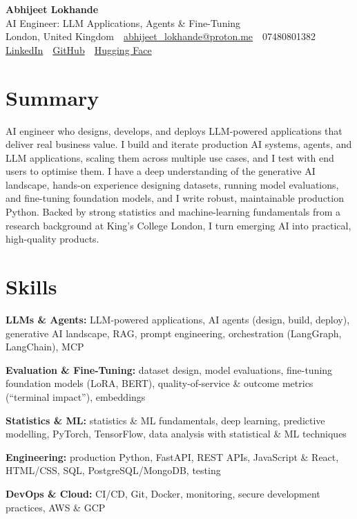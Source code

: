 \documentclass[10pt,a4paper]{article}
\newcommand{\sep}{\,\textcolor{accent!60}{\textbar}\,}
\begin{document}
\begin{center}
  {\fontsize{24}{26}\selectfont\bfseries Abhijeet Lokhande}\\[3pt]
  {\color{accent}\large AI Engineer: LLM Applications, Agents \& Fine-Tuning}\\[5pt]
  {\small
    London, United Kingdom \sep
    \href{mailto:abhijeet_lokhande@proton.me}{abhijeet\_lokhande@proton.me} \sep
    07480801382 \\[2pt]
    \href{https://www.linkedin.com/in/ablds/}{LinkedIn} \sep
    \href{https://github.com/abhijeetscode}{GitHub} \sep
    \href{https://huggingface.co/ab-ai}{Hugging Face}
  }
\end{center}
\vspace{2pt}

\section{Summary}
AI engineer who designs, develops, and deploys LLM-powered applications that deliver real business value. I build and iterate production AI systems, agents, and LLM applications, scaling them across multiple use cases, and I test with end users to optimise them. I have a deep understanding of the generative AI landscape, hands-on experience designing datasets, running model evaluations, and fine-tuning foundation models, and I write robust, maintainable production Python. Backed by strong statistics and machine-learning fundamentals from a research background at King's College London, I turn emerging AI into practical, high-quality products.

\section{Skills}
\begin{tight}
  \item[\textcolor{accent}{\small$\bullet$}] \textbf{LLMs \& Agents:} LLM-powered applications, AI agents (design, build, deploy), generative AI landscape, RAG, prompt engineering, orchestration (LangGraph, LangChain), MCP
  \item[\textcolor{accent}{\small$\bullet$}] \textbf{Evaluation \& Fine-Tuning:} dataset design, model evaluations, fine-tuning foundation models (LoRA, BERT), quality-of-service \& outcome metrics (``terminal impact''), embeddings
  \item[\textcolor{accent}{\small$\bullet$}] \textbf{Statistics \& ML:} statistics \& ML fundamentals, deep learning, predictive modelling, PyTorch, TensorFlow, data analysis with statistical \& ML techniques
  \item[\textcolor{accent}{\small$\bullet$}] \textbf{Engineering:} production Python, FastAPI, REST APIs, JavaScript \& React, HTML/CSS, SQL, PostgreSQL/MongoDB, testing
  \item[\textcolor{accent}{\small$\bullet$}] \textbf{DevOps \& Cloud:} CI/CD, Git, Docker, monitoring, secure development practices, AWS \& GCP
\end{tight}
\end{document}
